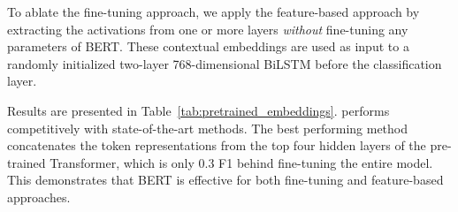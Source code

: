 To ablate the fine-tuning approach, we apply the feature-based approach by extracting the activations from one or more layers {\it without} fine-tuning any parameters of BERT. These contextual embeddings are used as input to a randomly initialized two-layer 768-dimensional BiLSTM before the classification layer.

Results are presented in Table~\ref{tab:pretrained_embeddings}. \bertlarge performs competitively with state-of-the-art methods. The best performing method concatenates the token representations from the top four hidden layers of the pre-trained Transformer, which is only 0.3 F1 behind fine-tuning the entire model. This demonstrates that BERT is effective for both fine-tuning and feature-based approaches.


